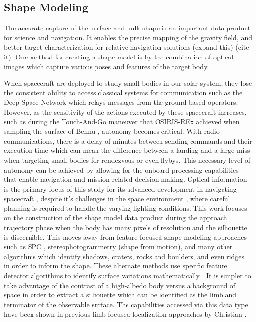 \subsection{Shape Modeling}
The accurate capture of the surface and bulk shape is an important data product for science and navigation. It enables the precise mapping of the gravity field, and better target characterization for relative navigation solutions (expand this) (cite it). One method for creating a shape model is by the combination of optical images which capture various poses and features of the target body. 


When spacecraft are deployed to study small bodies in our solar system, they lose the consistent ability to access classical systems for communication such as the Deep Space Network which relays messages from the ground-based operators. However, as the sensitivity of the actions executed by these spacecraft increases, such as during the Touch-And-Go maneuver that OSIRIS-REx achieved when sampling the surface of Bennu \cite{Berry2013}, autonomy becomes critical. With radio communications, there is a delay of minutes between sending commands and their execution time which can mean the difference between a landing and a large miss when targeting small bodies for rendezvous or even flybys. This necessary level of autonomy can be achieved by allowing for the onboard processing capabilities that enable navigation and mission-related decision making. Optical information is the primary focus of this study for its advanced development in navigating spacecraft \cite{Owen2011}, despite it's challenges in the space environment \cite{DellaGiustina2018}, where careful planning is required to handle the varying lighting conditions. This work focuses on the construction of the shape model data product during the approach trajectory phase when the body has many pixels of resolution and the silhouette is discernible. This moves away from feature-focused shape modeling approaches such as SPC \cite{Gaskell2008}, stereophotogrammetry (shape from motion)\cite{Hartley2000}, and many other algorithms which identify shadows, craters, rocks and boulders, and even ridges in order to inform the shape. These alternate methods use specific feature detector algorithms to identify surface variations mathematically \cite{Lowe2004}. It is simpler to take advantage of the contrast of a high-albedo body versus a background of space in order to extract a silhouette which can be identified as the limb and terminator of the observable surface. The capabilities accessed via this data type have been shown in previous limb-focused localization approaches by Christian \cite{Christian2017}. 

